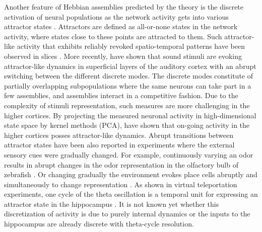     Another feature of Hebbian assemblies predicted by the theory is the
    discrete activation of neural populations as the network activity gets into
    various attractor states \citep{Hopfield1982}. Attractors are defined as
    all-or-none states in the network activity, where states close to these
    points are attracted to them. Such attractor-like activity that exhibits
    reliably revoked spatio-temporal patterns have been observed in slices
    \cite[e.g.,][]{Cossart2003, MacLean2005}. More recently,
    \cite{Bathellier2012} have shown that sound stimuli are evoking
    attractor-like dynamics in superficial layers of the auditory cortex with
    an abrupt switching between the different discrete modes. The discrete
    modes constitute of partially overlapping subpopulations where the same
    neurons can take part in a few assemblies, and assemblies interact in a
    competitive fashion. Due to the complexity of stimuli representation, such
    measures are more challenging in the higher cortices. By projecting the
    measured neuronal activity in high-dimensional state space by kernel
    methods (PCA), \cite{Balaguer2011} have shown that on-going activity in the
    higher cortices posses attractor-like dynamics. Abrupt transitions between
    attractor states have been also reported in experiments where the external
    sensory cues were gradually changed. For example, continuously varying an
    odor results in abrupt changes in the odor representation in the olfactory
    bulb of zebrafish \citep{Niessing2010}. Or changing gradually the
    environment evokes place cells abruptly and simultaneously to change
    representation \citep{Wills2005}. As shown in virtual teleportation
    experiments, one cycle of the theta oscillation is a temporal unit for
    expressing an attractor state in the hippocampus \citep{Jezek2011}. It is
    not known yet whether this discretization of activity is due to purely
    internal dynamics or the inputs to the hippocampus are already discrete
    with theta-cycle resolution. 



